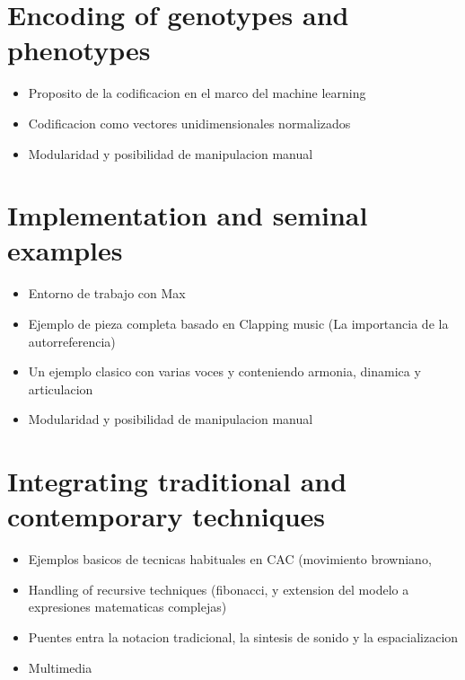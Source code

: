 \documentclass{article}
\begin{document}


\section{Encoding of genotypes and phenotypes}
\begin{itemize}
\item Proposito de la codificacion en el marco del machine learning
\item Codificacion como vectores unidimensionales normalizados
\item Modularidad y posibilidad de manipulacion manual
\end{itemize}




\section{Implementation and seminal examples}

\begin{itemize}
\item Entorno de trabajo con Max
\item Ejemplo de pieza completa basado en Clapping music (La importancia de la autorreferencia)
\item Un ejemplo clasico con varias voces y conteniendo armonia, dinamica y articulacion
\item Modularidad y posibilidad de manipulacion manual
\end{itemize}



\section{Integrating traditional and contemporary techniques}

\begin{itemize}
\item Ejemplos basicos de tecnicas habituales en CAC (movimiento browniano,
\item Handling of recursive techniques (fibonacci, y extension del modelo a expresiones matematicas complejas)
\item Puentes entra la notacion tradicional, la sintesis de sonido y la espacializacion
\item Multimedia
\end{itemize}
\end{document}
